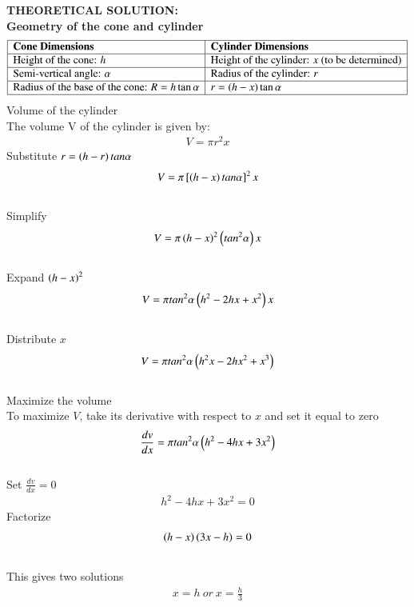 \documentclass[journal]{IEEEtran}
\begin{document}
 \textbf{THEORETICAL SOLUTION:}\\
 \textbf{Geometry of the cone and cylinder}
\[
\begin{array}{|l|l|}
\hline
\textbf{Cone Dimensions} & \textbf{Cylinder Dimensions} \\ 
\hline
\text{Height of the cone: } h & \text{Height of the cylinder: } x \text{ (to be determined)} \\ 
\hline
\text{Semi-vertical angle: } \alpha & \text{Radius of the cylinder: } r \\ 
\hline
\text{Radius of the base of the cone: } R = h \tan \alpha & r = (h - x) \tan \alpha \\ 
\hline
\end{array}
\]
Volume of the cylinder\\
The volume V of the cylinder is given by:
\begin{align}
    V=\pi r^{2}x
\end{align}
Substitute $r=\left(h-r\right)tan\alpha$
\begin{align}
    V=\pi{}\left[\left(h-x\right)tan \alpha\right]^{2}x
\end{align}\\
Simplify
\begin{align}
    V=\pi\left(h-x\right)^{2}\left(tan^{2}\alpha\right)x
\end{align}\\
Expand $\left(h-x\right)^{2}$
\begin{align}
    V=\pi tan^{2}\alpha\left(h^{2}-2hx+x^{2}\right)x
\end{align}\\
Distribute $x$
\begin{align}
     V=\pi tan^{2}\alpha\left(h^{2}x-2hx^{2}+x^{3}\right)
\end{align}\\
Maximize the volume\\
To maximize $V$, take its derivative with respect to $x$ and set it equal to zero
\begin{align}
    \frac{dv}{dx}=\pi tan^{2}\alpha\left(h^{2}-4hx+3x^{2}\right)
\end{align}\\
Set $\frac{dv}{dx}=0$
\begin{align}
    h^{2}-4hx+3x^{2}=0
\end{align}
Factorize
\begin{align}
    \left(h-x\right) \left(3x-h\right)=0
\end{align}\\
This gives two solutions
\begin{align}
    x=h \ or \ x=\frac{h}{3}
\end{align}\\
\end{document}

